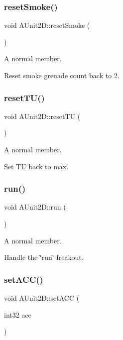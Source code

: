 \subsubsection{\texorpdfstring{reset\+Smoke()}{resetSmoke()}}
{\footnotesize\ttfamily void A\+Unit2\+D\+::reset\+Smoke (\begin{DoxyParamCaption}{ }\end{DoxyParamCaption})}



A normal member. 

Reset smoke grenade count back to 2. \hypertarget{class_a_unit2_d_a141b33f9f1c9409e645960903ccb714f}{}\label{class_a_unit2_d_a141b33f9f1c9409e645960903ccb714f} 
\subsubsection{\texorpdfstring{reset\+T\+U()}{resetTU()}}
{\footnotesize\ttfamily void A\+Unit2\+D\+::reset\+TU (\begin{DoxyParamCaption}{ }\end{DoxyParamCaption})}



A normal member. 

Set TU back to max. \hypertarget{class_a_unit2_d_aa0a382d42b3024c460e549054b158803}{}\label{class_a_unit2_d_aa0a382d42b3024c460e549054b158803} 
\subsubsection{\texorpdfstring{run()}{run()}}
{\footnotesize\ttfamily void A\+Unit2\+D\+::run (\begin{DoxyParamCaption}{ }\end{DoxyParamCaption})}



A normal member. 

Handle the \char`\"{}run\char`\"{} freakout. \hypertarget{class_a_unit2_d_a6c9367b81fabd482ded876c47e006d35}{}\label{class_a_unit2_d_a6c9367b81fabd482ded876c47e006d35} 
\subsubsection{\texorpdfstring{set\+A\+C\+C()}{setACC()}}
{\footnotesize\ttfamily void A\+Unit2\+D\+::set\+A\+CC (\begin{DoxyParamCaption}\item[{int32}]{acc }\end{DoxyParamCaption})}



